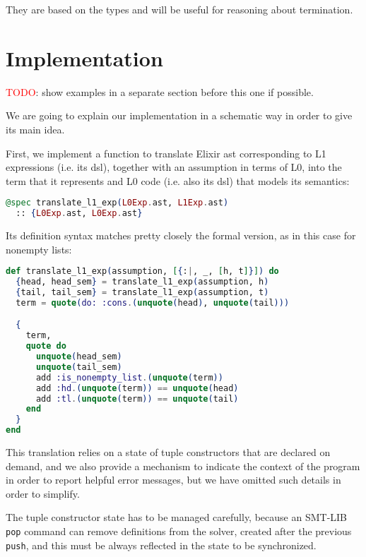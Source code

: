 They are based on the types and will be useful for reasoning about termination.

\section{Implementation}
\label{ir:l1implementation}

\textcolor{red}{TODO}: show examples in a separate section before this one if possible.

We are going to explain our implementation in a schematic way in order to give its 
main idea. 

First, we implement a function to translate Elixir \gls{ast} corresponding
to L1 expressions (i.e. its \gls{dsl}), together with an assumption in terms of L0, 
into the term that it represents and L0 code (i.e. also its \gls{dsl}) that models 
its semantics:

\begin{lstlisting}[language=elixir,numbers=none,frame=none]
@spec translate_l1_exp(L0Exp.ast, L1Exp.ast) 
  :: {L0Exp.ast, L0Exp.ast}
\end{lstlisting}

Its definition syntax matches pretty closely the formal version, as in this 
case for nonempty lists:

\begin{lstlisting}[language=elixir,numbers=none,frame=none]
def translate_l1_exp(assumption, [{:|, _, [h, t]}]) do
  {head, head_sem} = translate_l1_exp(assumption, h)
  {tail, tail_sem} = translate_l1_exp(assumption, t)
  term = quote(do: :cons.(unquote(head), unquote(tail)))

  {
    term,
    quote do
      unquote(head_sem)
      unquote(tail_sem)
      add :is_nonempty_list.(unquote(term))
      add :hd.(unquote(term)) == unquote(head)
      add :tl.(unquote(term)) == unquote(tail)
    end
  }
end
\end{lstlisting}

This translation relies on a state of tuple constructors that are declared on 
demand, and we also provide a mechanism to indicate the context of the program 
in order to report helpful error messages, but we have omitted such details in 
order to simplify. 

The tuple constructor state has to be managed carefully, because
an SMT-LIB \verb|pop| command can remove definitions from the solver, created after 
the previous \verb|push|, and this must be always reflected in the state to be 
synchronized.

